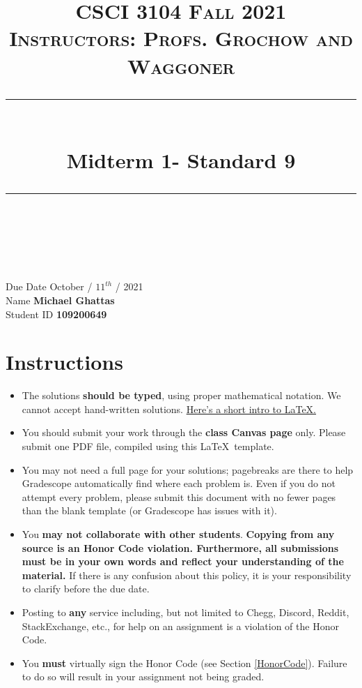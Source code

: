 \documentclass[11pt]{article}
\title{
\normalfont \normalsize 
\textsc{CSCI 3104 Fall 2021 \\ 
Instructors: Profs. Grochow and Waggoner} \\
[10pt] 
\rule{\linewidth}{0.5pt} \\[6pt] 
\huge Midterm 1- Standard 9 \\
\rule{\linewidth}{2pt}  \\[10pt]
}
\date{}
\theoremstyle{definition}
\theoremstyle{definition}
\theoremstyle{definition}
\begin{document}

\maketitle


\noindent
Due Date \dotfill October / $11^{th}$ / 2021 \\
Name \dotfill \textbf{Michael Ghattas} \\
Student ID \dotfill \textbf{109200649} \\


\tableofcontents

\section{Instructions}
 \begin{itemize}
	\item The solutions \textbf{should be typed}, using proper mathematical notation. We cannot accept hand-written solutions. \href{http://ece.uprm.edu/~caceros/latex/introduction.pdf}{Here's a short intro to \LaTeX.}
	\item You should submit your work through the \textbf{class Canvas page} only. Please submit one PDF file, compiled using this \LaTeX \ template.
	\item You may not need a full page for your solutions; pagebreaks are there to help Gradescope automatically find where each problem is. Even if you do not attempt every problem, please submit this document with no fewer pages than the blank template (or Gradescope has issues with it).

	\item You \textbf{may not collaborate with other students}. \textbf{Copying from any source is an Honor Code violation. Furthermore, all submissions must be in your own words and reflect your understanding of the material.} If there is any confusion about this policy, it is your responsibility to clarify before the due date. 

	\item Posting to \textbf{any} service including, but not limited to Chegg, Discord, Reddit, StackExchange, etc., for help on an assignment is a violation of the Honor Code.

	\item You \textbf{must} virtually sign the Honor Code (see Section \ref{HonorCode}). Failure to do so will result in your assignment not being graded.
\end{itemize}
\end{document}
